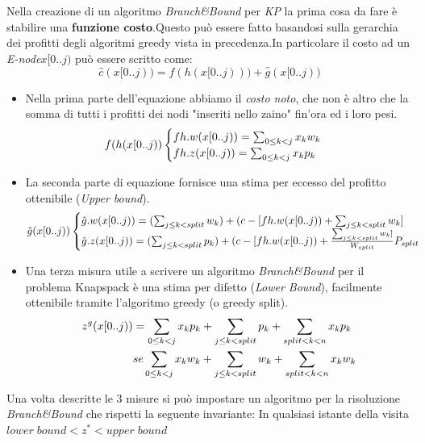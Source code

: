 \documentclass[a4paper]{article}
\begin{document}
Nella creazione di un algoritmo \textit{Branch\&Bound} per \emph{KP} la prima cosa da fare è stabilire una \textbf{funzione costo}.Questo può essere fatto basandosi sulla gerarchia dei profitti degli algoritmi greedy vista in precedenza.In particolare il costo ad un \textit{E-node}$x[0..j)$ può essere scritto come:
$$\hat{c}(x[0..j)) = f(h(x[0..j))) + \hat{g}(x[0..j))$$
\begin{itemize}
	\item Nella prima parte dell'equazione abbiamo il \textit{costo noto}, che non è altro che la somma di tutti i profitti dei nodi "inseriti nello zaino" fin'ora ed i loro pesi. 
		\begin{equation}
                	f(h(x[0..j))\begin{cases}
			fh.w(x[0..j))= \sum_{0\leq k < j} x_{k}w_{k}\\
			fh.z(x[0..j))= \sum_{0\leq k < j} x_{k}p_{k}\notag
                \end{cases}
	        \end{equation}
	\item La seconda parte di equazione fornisce una stima per eccesso del profitto ottenibile (\textit{Upper bound}).
		\begin{equation}
			\hat{g}(x[0..j))\begin{cases}
				\hat{g}.w(x[0..j))= (\sum_{j\leq k < split} w_{k})+(c-[fh.w(x[0..j)) + \sum_{j\leq k < split} w_{k}]\\
				\hat{g}.z(x[0..j))= (\sum_{j\leq k < split} p_{k})+(c-[fh.w(x[0..j)) + \frac{\sum_{j\leq k < split} w_{k}]}{W_{split}}P_{split} \notag
                	\end{cases}
	        \end{equation}
	\item Una terza misura utile a scrivere un algoritmo \textit{Branch\&Bound} per il problema Knapspack è una stima per difetto (\textit{Lower Bound}), facilmente ottenibile tramite l'algoritmo greedy (o greedy split).
		\begin{align}
				z^g(x[0..j)) &= \sum_{0\leq k < j} x_{k}p_{k} + \sum_{j\leq k < split} p_{k} + \sum_{split < k < n} x_{k}p_{k} \notag \\
			&se \sum_{0\leq k < j} x_{k}w_{k} + \sum_{j\leq k < split} w_{k} + \sum_{split < k < n} x_{k}w_{k}\notag
		\end{align}
\end{itemize}
Una volta descritte le 3 misure si può impostare un algoritmo per la risoluzione \textit{Branch\&Bound} che rispetti la seguente invariante: In qualsiasi istante della visita $lower \; bound < z^* < upper \; bound$\\
\end{document}
